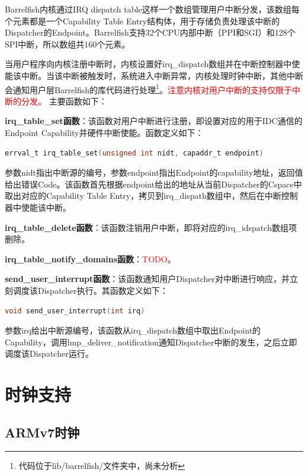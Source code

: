 \documentclass[a4paper, 12pt]{report}
\begin{document}
    Barrelfish内核通过IRQ dispatch table这样一个数组管理用户中断分发，该数组每个元素都是一个Capability Table Entry结构体，用于存储负责处理该中断的Dispatcher的Endpoint。Barrelfish支持32个CPU内部中断（PPI和SGI）和128个SPI中断，所以数组共160个元素。
    
    当用户程序向内核注册中断时，内核设置好irq\_dispatch数组并在中断控制器中使能该中断。当该中断被触发时，系统进入中断异常，内核处理时钟中断，其他中断会通知用户层Barrelfish的库代码进行处理\footnote{代码位于lib/barrelfish/文件夹中，尚未分析}。\textcolor{red}{注意内核对用户中断的支持仅限于中断的分发。}
    主要函数如下：
    
    \textbf{irq\_table\_set函数}：该函数对用户中断进行注册，即设置对应的用于IDC通信的Endpoint Capability并硬件中断使能。函数定义如下：
    
    \begin{lstlisting}[language=C]
    errval_t irq_table_set(unsigned int nidt, capaddr_t endpoint)
    \end{lstlisting}
    参数nidt指出中断源的编号，参数endpoint指出Endpoint的capability地址，返回值给出错误Code。该函数首先根据endpoint给出的地址从当前Dispatcher的Cspace中取出对应的Capability Table Entry，拷贝到irq\_dispath数组中，然后在中断控制器中使能该中断。
    
    \textbf{irq\_table\_delete函数}：该函数注销用户中断，即将对应的irq\_idspatch数组项删除。
    
    \textbf{irq\_table\_notify\_domains函数}：\textcolor{red}{TODO}。
    
    \textbf{send\_user\_interrupt函数}：该函数通知用户Dispatcher对中断进行响应，并立刻调度该Dispatcher执行。其函数定义如下：
    
   \begin{lstlisting}[language=C]
   void send_user_interrupt(int irq)
   \end{lstlisting}
    参数irq给出中断源编号，该函数从irq\_dispatch数组中取出Endpoint的Capability，调用lmp\_deliver\_notification通知Dispatcher中断的发生，之后立即调度该Dispatcher运行。

    \chapter{时钟支持}
    
    \section{ARMv7时钟}
    
    \label{section:armv7Timer}
    
\end{document}
